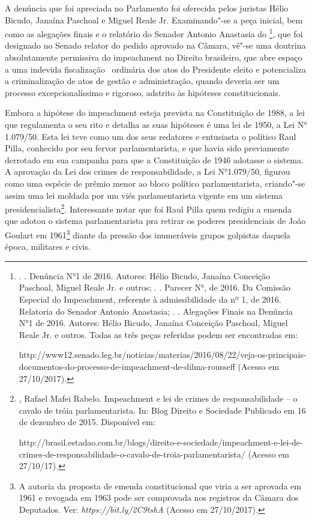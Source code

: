 A denúncia que foi apreciada no Parlamento foi oferecida pelos juristas
Hélio Bicudo, Janaína Paschoal e Miguel Reale Jr. Examinando"-se a peça
inicial, bem como as alegações finais e o relatório do Senador Antonio
Anastasia do \footnote{.   . Denúncia N°1 de
  2016. Autores: Hélio Bicudo, Janaína Conceição Paschoal, Miguel Reale
  Jr. e outros; .  . Parecer N°, de 2016. Da Comissão
  Especial do Impeachment, referente à admissibilidade da  nº 1, de
  2016. Relatoria do Senador Antonio Anastasia; .  .
  Alegações Finais na Denúncia N°1 de 2016. Autores: Hélio Bicudo,
  Janaína Conceição Paschoal, Miguel Reale Jr. e outros. Todas as três
  peças referidas podem ser encontradas em:

  http://www12.senado.leg.br/noticias/materias/2016/08/22/veja-os-principais-documentos-do-processo-de-impeachment-de-dilma-rousseff
  (Acesso em 27/10/2017).}, que foi designado no Senado relator do
pedido aprovado na Câmara, vê"-se uma doutrina absolutamente permissiva
do impeachment no Direito brasileiro, que abre espaço a uma indevida
fiscalização~ ordinária dos atos do Presidente eleito e potencializa a
criminalização de atos de gestão e administração, quando deveria ser um
processo excepcionalíssimo e rigoroso, adstrito às hipóteses
constitucionais.

Embora a hipótese do impeachment esteja prevista na Constituição de
1988, a lei que regulamenta o seu rito e detalha as suas hipóteses é uma
lei de 1950, a Lei N° 1.079/50. Esta lei teve como um dos seus redatores
e entusiasta o político Raul Pilla, conhecido por seu fervor
parlamentarista, e que havia sido previamente derrotado em sua campanha
para que a Constituição de 1946 adotasse o sistema. A aprovação da Lei
dos crimes de responsabilidade, a Lei N°1.079/50, figurou como uma
espécie de prêmio menor ao bloco político parlamentarista, criando"-se
assim uma lei moldada por um viés parlamentarista vigente em um sistema
presidencialista\footnote{, Rafael Mafei Rabelo. Impeachment e
  lei de crimes de responsabilidade -- o cavalo de tróia parlamentarista.
  In: Blog Direito e Sociedade Publicado em 16 de dezembro de 2015.
  Disponível em:

  http://brasil.estadao.com.br/blogs/direito-e-sociedade/impeachment-e-lei-de-crimes-de-responsabilidade-o-cavalo-de-troia-parlamentarista/
  (Acesso em 27/10/17).}. Interessante notar que foi Raul Pilla quem
redigiu a emenda que adotou o sistema parlamentarista pra retirar os
poderes presidenciais de João Goulart em 1961\footnote{A autoria da
  proposta de emenda constitucional que viria a ser aprovada em 1961 e
  revogada em 1963 pode ser comprovada nos registros da Câmara dos
  Deputados. Ver:
  \emph{https://bit.ly/2C9tshA}
  (Acesso em 27/10/2017).} diante da pressão dos inumeráveis grupos
golpistas daquela época, militares e civis.

